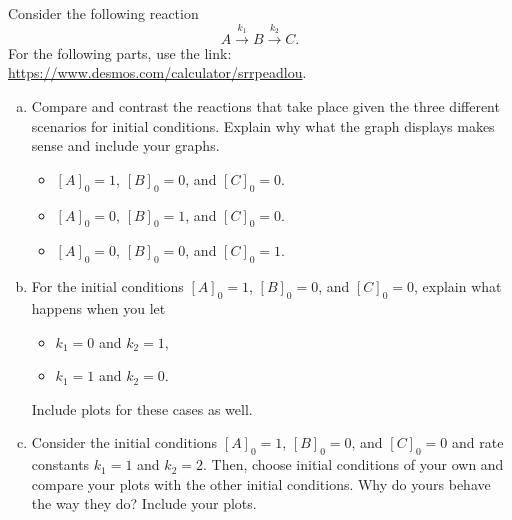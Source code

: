 \documentclass[12pt]{article} %
\begin{document}
\begin{problem}
Consider the following reaction
\[
A \xrightarrow{k_1} B \xrightarrow{k_2} C.
\]
For the following parts, use the link: \url{https://www.desmos.com/calculator/srrpeadlou}.
\begin{enumerate}[(a)]
    \item Compare and contrast the reactions that take place given the three different scenarios for initial conditions. Explain why what the graph displays makes sense and include your graphs.
    \begin{itemize}
        \item $[A]_0 = 1$, $[B]_0=0$, and $[C]_0 =0$.
        \item $[A]_0 = 0$, $[B]_0=1$, and $[C]_0 =0$.
        \item $[A]_0 = 0$, $[B]_0=0$, and $[C]_0 =1$.
    \end{itemize}
    \item For the initial conditions $[A]_0 = 1$, $[B]_0=0$, and $[C]_0 =0$, explain what happens when you let
    \begin{itemize}
        \item $k_1=0$ and $k_2=1$,
        \item $k_1=1$ and $k_2=0$.
    \end{itemize}
    Include plots for these cases as well.
    \item Consider the initial conditions $[A]_0 = 1$, $[B]_0=0$, and $[C]_0 =0$ and rate constants $k_1=1$ and $k_2=2$. Then, choose initial conditions of your own and compare your plots with the other initial conditions. Why do yours behave the way they do? Include your plots.
\end{enumerate}
\end{problem}
\end{document}
